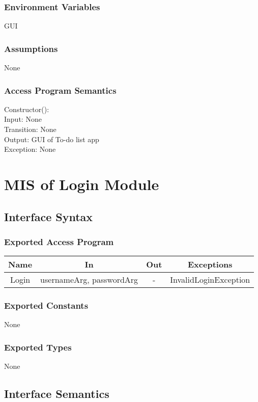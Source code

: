 \documentclass[12pt, titlepage]{article}
\begin{document}
\subsubsection{Environment Variables}
GUI
\subsubsection{Assumptions}
None
\subsubsection{Access Program Semantics}
Constructor():\\

    Input: None\\

    Transition: None\\

    Output: GUI of To-do list app\\

    Exception: None\\

\newpage




\section{MIS of Login Module}
\subsection{Interface Syntax}
\subsubsection{Exported Access Program}
\begin{tabular}[pos]{|c|c|c|c|}
    \hline
    \textbf{Name}& \textbf{In} & \textbf{Out} & \textbf{Exceptions} \\ \hline
    Login & usernameArg, passwordArg & - & InvalidLoginException \\ \hline
\end{tabular}
\subsubsection{Exported Constants}
None
\subsubsection{Exported Types}
None
\subsection{Interface Semantics}
\end{document}
